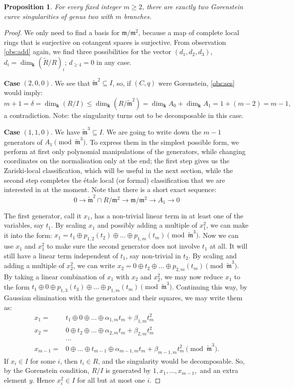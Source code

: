 \documentclass{compositio}
\renewcommand{\k}{\mathbf k}
\newcommand{\m}{\mathfrak m}
\newcommand{\tR}{\widetilde{R}}
\newcommand{\tm}{\widetilde{\mathfrak m}}
\renewcommand{\to}{\rightarrow}
\theoremstyle{plain}
\newtheorem{prop}[thm]{Proposition}
\theoremstyle{definition}
\theoremstyle{remark}
\begin{document}
\begin{prop}\label{prop:classification}
 For every fixed integer $m\geq 2$, there are exactly two Gorenstein curve singularities of genus two with $m$ branches.
\end{prop}
\begin{proof}
 We only need to find a basis for $\m/\m^2$, because a map of complete local rings that is surjective on cotangent spaces is surjective. From observation \eqref{obs:add} again, we find three possibilities for the vector $(d_1,d_2,d_3)$, $d_i=\dim_{\k}(\tR/R)_i$; $d_{\geq 4}=0$ in any case.
 
 \smallskip
 
 \textbf{Case} $(2,0,0)$. We see that $\tm^2\subseteq I$, so, if $(C,q)$ were Gorenstein, \eqref{obs:ses} would imply: \[m+1=\delta=\dim_\k(R/I)\leq \dim_\k(R/\tm^2)=\dim_\k A_0+\dim_\k A_1=1+(m-2)=m-1,\] a contradiction. Note: the singularity turns out to be decomposable in this case.
 
 \smallskip
 
 \textbf{Case} $(1,1,0)$. We have $\tm^3\subseteq I$. We are going to write down the $m-1$ generators of $A_1 \pmod {\tm^3}$. To express them in the simplest possible form, we perform at first only polynomial manipulations of the generators, while changing coordinates on the normalisation only at the end; the first step gives us the Zariski-local classification, which will be useful in the next section, while the second step completes the \'etale local (or formal) classification that we are interested in at the moment. Note that there is a short exact sequence:
 \[0\to{\tm^2\cap R}/{\m^2}\to{\m}/{\m^2}\to A_1\to 0\]
 
 The first generator, call it $x_1$, has a non-trivial linear term in at least one of the variables, say $t_1$. By scaling $x_1$ and possibly adding a multiple of $x_1^2$, we can make it into the form:
 $x_1=t_1\oplus p_{1,2}(t_2)\oplus\ldots\oplus p_{1,m}(t_m) \pmod{\tm^3}.$ Now we can use $x_1$ and $x_1^2$ to make sure the second generator does not involve $t_1$ at all. It will still have a linear term independent of $t_1$, say non-trivial in $t_2$. By scaling and adding a multiple of $x_2^2$, we can write $x_2=0\oplus t_2\oplus\ldots\oplus p_{2,m}(t_m) \pmod{\tm^3}.$ By taking a linear combination of $x_1$ with $x_2$ and $x_2^2$, we may now reduce $x_1$ to the form $t_1\oplus0\oplus p_{1,3}(t_3)\oplus\ldots\oplus p_{1,m}(t_m)\pmod{\tm^3}$. Continuing this way, by Gaussian elimination with the generators and their squares, we may write them as:
 \begin{align*}
  x_1= & t_1\oplus0\oplus\ldots\oplus\alpha_{1,m}t_m+\beta_{1,m}t_m^2\\
  x_2= & 0\oplus t_2\oplus\ldots\oplus\alpha_{2,m}t_m+\beta_{2,m}t_m^2\\
  &\ldots\\
  x_{m-1}= & 0\oplus\ldots\oplus t_{m-1}\oplus\alpha_{m-1,m}t_m+\beta_{m-1,m}t_m^2 \pmod{\tm^3}.
 \end{align*}
 If $x_i\in I$ for some $i$, then $t_i\in R$, and the singularity would be decomposable. So, by the Gorenstein condition, $R/I$ is generated by $1,x_1,\ldots,x_{m-1},$ and an extra element $y$. Hence $x_i^2\in I$ for all but at most one $i$.
 

\end{proof}
\end{document}

